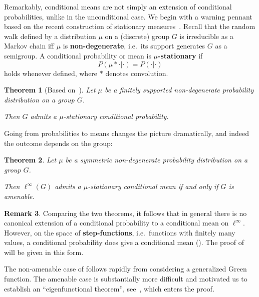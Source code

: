 \documentclass[11pt]{amsart}
\numberwithin{equation}{section}
\newtheorem{ithm}{Theorem}
\theoremstyle{definition}
\theoremstyle{definition}
\newtheorem{irem}[ithm]{Remark}
\begin{document}
\medskip
Remarkably, conditional means are not simply an extension of conditional probabilities, unlike in the unconditional case. We begin with a warning pennant based on the recent construction of stationary measures~\cite{Alhalimi-Hutchcroft-Pan-Tamuz-Zheng_pre}.  Recall that the random walk defined by a distribution $\mu$ on a (discrete) group $G$ is irreducible as a Markov chain iff $\mu$ is \textbf{non-degenerate}, i.e.\ its support generates $G$ as a semigroup. A conditional probability or mean is \textbf{$\mu$-stationary} if
\begin{equation*}
P(\mu * \cdot|\cdot) = P(\cdot|\cdot)
\end{equation*}
holds whenever defined, where $*$ denotes convolution.


\begin{ithm}[Based on~\cite{Alhalimi-Hutchcroft-Pan-Tamuz-Zheng_pre}]\label{ithm:stat:meas}
Let $\mu$ be a finitely supported non-degenerate probability distribution on a group $G$.

Then $G$ admits a $\mu$-stationary conditional probability.
\end{ithm}

Going from probabilities to means changes the picture dramatically, and indeed the outcome depends on the group:

\begin{ithm}\label{ithm:stat:mean}
Let $\mu$ be a symmetric non-degenerate probability distribution on a group $G$.

Then $\ell^\infty(G)$ admits a $\mu$-stationary conditional mean if and only if $G$ is amenable.
\end{ithm}

\begin{irem}\label{irem:step}
Comparing the two theorems, it follows that in general there is no canonical extension of a conditional probability to a  conditional mean on $\ell^\infty$.
However, on the space of \textbf{step-functions}, i.e.\ functions with finitely many values, a conditional probability does give a conditional mean (). The proof of  will be given in this form.
\end{irem}

The non-amenable case of  follows rapidly from considering a generalized Green function. The amenable case is substantially more difficult and motivated us to establish an ``eigenfunctional theorem'', see~\cite{Monod_eigenform_pre}, which enters the proof.
\end{document}
